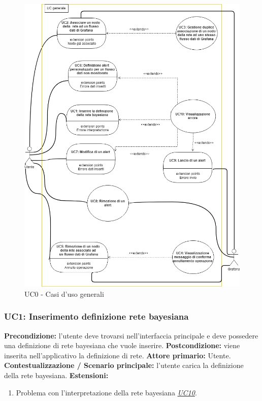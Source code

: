		\begin{figure}[!htbp]
			\centering
			\includegraphics[width=\textwidth]{UC.png}
			\caption{UC0 - Casi d'uso generali}
		\end{figure}
		\clearpage
		
		
				\subsubsection{UC1: Inserimento definizione rete bayesiana}
                    \textbf{Precondizione:} l’utente deve trovarsi nell’interfaccia principale e deve possedere una definizione di rete bayesiana che vuole inserire.
                    \newline
                    \textbf{Postcondizione:} viene inserita nell’applicativo la definizione di rete.
                    \newline
                    \textbf{Attore primario:} Utente.
                    \newline
                    \textbf{Contestualizzazione / Scenario principale:} l’utente carica la definizione della rete bayesiana.
                    \newline
                    \textbf{Estensioni:} 
                    	\begin{enumerate}
                            \item Problema con l’interpretazione della rete bayesiana \underline{\textit{UC10}}.
                        \end{enumerate}
                        

